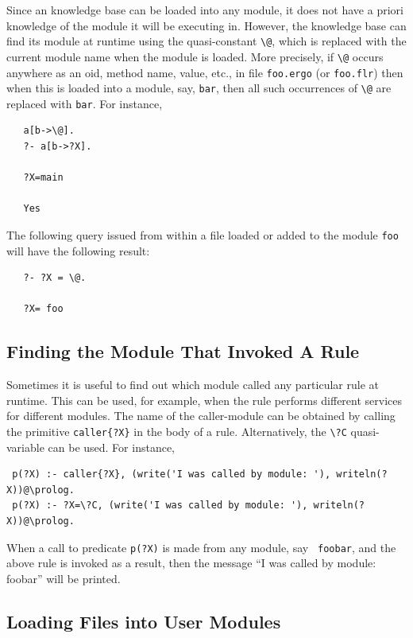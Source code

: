 \documentclass[11pt]{article}
\makeatletter
\newcommand{\ERGO}{\mbox{\smaller{\ensuremath{\cal{E}}\smaller{{\sc{RGO}}}}}\xspace}
\newcommand{\FLSYSTEM}{\ERGO}
\newcommand{\flrext}{flr\xspace}
\newcommand{\ergoext}{ergo\xspace}
\newcommand{\thismodule}{{\tt \bs{}@}\xspace}
\newcommand{\bs}{\textbackslash}
\makeatother
\begin{document}
\index{module!\thismodule}
\index{\thismodule}
%
Since an \FLSYSTEM knowledge base can be loaded into any module, it does not
have a priori knowledge of the module it will be executing in. However, the
knowledge base can find its module at runtime using the quasi-constant
\thismodule, which is replaced with the current module name when the module
is loaded. More precisely, if \thismodule occurs anywhere as an oid, method
name, value, etc., in file \texttt{foo.\ergoext} (or \texttt{foo.\flrext}) then when this is loaded
into a module, say, {\tt bar}, then all such occurrences of \thismodule are
replaced with {\tt bar}. For instance,
\begin{verbatim}
   a[b->\@].
   ?- a[b->?X].

   ?X=main

   Yes
\end{verbatim}
The following query issued from within a file loaded or added to
the module \texttt{foo} will have
the following result:
\begin{verbatim}
   ?- ?X = \@.

   ?X= foo
\end{verbatim}

\subsection{Finding the Module That Invoked A Rule}

\index{{\tt \bs{}?C} quasi-variable}
Sometimes it is useful to find out which module called any particular rule
at runtime. This can be used, for example, when the rule performs
different services for different modules. The name of the caller-module can
be obtained by calling the primitive {\tt caller\{?X\}}  in the body of a rule.
Alternatively, the \texttt{\bs{}?C} quasi-variable can be used. 
For instance, 
\begin{verbatim}
 p(?X) :- caller{?X}, (write('I was called by module: '), writeln(?X))@\prolog.
 p(?X) :- ?X=\?C, (write('I was called by module: '), writeln(?X))@\prolog.
\end{verbatim}
When a call to predicate {\tt p(?X)} is made from any module, say {\tt
  foobar}, and the above rule is invoked as a result, then the message ``I
was called by module: foobar'' will be printed. 


\subsection{Loading Files into User Modules}\label{sec-loading-mods}
\end{document}
